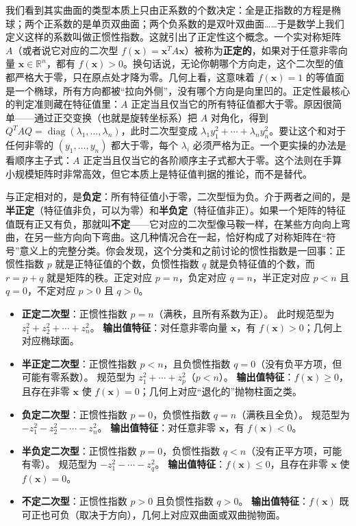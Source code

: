 \documentclass[UTF8]{ctexbook}
\begin{document}
我们看到其实曲面的类型本质上只由正系数的个数决定：全是正指数的方程是椭球；两个正系数的是单页双曲面；两个负系数的是双叶双曲面……于是数学上我们定义这样的系数叫做正惯性指数。这就引出了正定性这个概念。一个实对称矩阵 \(A\)（或者说它对应的二次型 \(f(\mathbf{x})=\mathbf{x}^T A\mathbf{x}\)）被称为\textbf{正定的}，如果对于任意非零向量 \(\mathbf{x}\in\mathbb{R}^n\)，都有 \(f(\mathbf{x})>0\)。换句话说，无论你朝哪个方向走，这个二次型的值都严格大于零，只在原点处才降为零。几何上看，这意味着 \(f(\mathbf{x})=1\) 的等值面是一个椭球，所有方向都被“拉向外侧”，没有哪个方向是向里凹的。正定性最核心的判定准则藏在特征值里：\(A\) 正定当且仅当它的所有特征值都大于零。原因很简单——通过正交变换（也就是旋转坐标系）把 \(A\) 对角化，得到 \(Q^T A Q = \operatorname{diag}(\lambda_1,\dots,\lambda_n)\)，此时二次型变成 \(\lambda_1 y_1^2+\cdots+\lambda_n y_n^2\)。要让这个和对于任何非零的 \((y_1,\dots,y_n)\) 都大于零，每个 \(\lambda_i\) 必须严格为正。一个更实操的办法是看顺序主子式：\(A\) 正定当且仅当它的各阶顺序主子式都大于零。这个法则在手算小规模矩阵时非常高效，但它本质上是特征值判据的推论，而不是替代。

与正定相对的，是\textbf{负定}：所有特征值小于零，二次型恒为负。介于两者之间的，是\textbf{半正定}（特征值非负，可以为零）和\textbf{半负定}（特征值非正）。如果一个矩阵的特征值既有正又有负，那就叫\textbf{不定}——它对应的二次型像马鞍一样，在某些方向向上弯曲，在另一些方向向下弯曲。这几种情况合在一起，恰好构成了对称矩阵在“符号”意义上的完整分类。你会发现，这个分类和之前讨论的惯性指数是一回事：正惯性指数 \(p\) 就是正特征值的个数，负惯性指数 \(q\) 就是负特征值的个数，而 \(r=p+q\) 就是矩阵的秩。正定对应 \(p=n\)，负定对应 \(q=n\)，半正定对应 \(p<n\) 且 \(q=0\)，不定对应 \(p>0\) 且 \(q>0\)。


\begin{itemize}
  \item \textbf{正定二次型}：正惯性指数 $p = n$（满秩，且所有系数为正）。  
  此时规范型为 $z_1^2 + z_2^2 + \cdots + z_n^2$。  
  \textbf{输出值特征}：对任意非零向量 $\mathbf{x}$，有 $f(\mathbf{x}) > 0$；几何上对应椭球面。

  \item \textbf{半正定二次型}：正惯性指数 $p < n$，且负惯性指数 $q = 0$（没有负平方项，但可能有零系数）。  
  规范型为 $z_1^2 + \cdots + z_p^2$（$p < n$）。  
  \textbf{输出值特征}：$f(\mathbf{x}) \ge 0$，且存在非零 $\mathbf{x}$ 使 $f(\mathbf{x}) = 0$；几何上对应“退化的”抛物柱面之类。

  \item \textbf{负定二次型}：正惯性指数 $p = 0$，负惯性指数 $q = n$（满秩且全负）。  
  规范型为 $-z_1^2 - z_2^2 - \cdots - z_n^2$。  
  \textbf{输出值特征}：对任意非零 $\mathbf{x}$，有 $f(\mathbf{x}) < 0$。

  \item \textbf{半负定二次型}：正惯性指数 $p = 0$，负惯性指数 $q < n$（没有正平方项，可能有零）。  
  规范型为 $ -z_1^2 - \cdots - z_q^2$。  
  \textbf{输出值特征}：$f(\mathbf{x}) \le 0$，且存在非零 $\mathbf{x}$ 使 $f(\mathbf{x}) = 0$。

  \item \textbf{不定二次型}：正惯性指数 $p > 0$ 且负惯性指数 $q > 0$。  
  \textbf{输出值特征}：$f(\mathbf{x})$ 既可正也可负（取决于方向），几何上对应双曲面或双曲抛物面。
\end{itemize}
\end{document}
